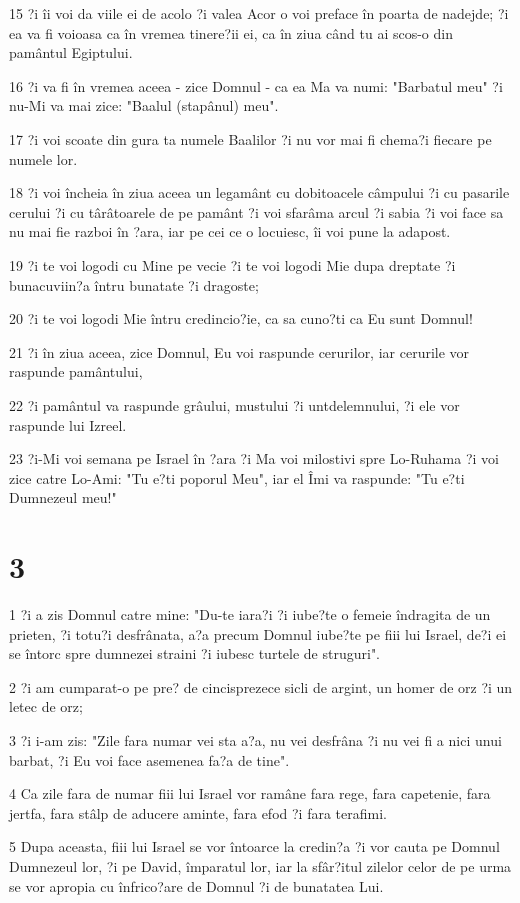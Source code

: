 \par 15 ?i îi voi da viile ei de acolo ?i valea Acor o voi preface în poarta de nadejde; ?i ea va fi voioasa ca în vremea tinere?ii ei, ca în ziua când tu ai scos-o din pamântul Egiptului.
\par 16 ?i va fi în vremea aceea - zice Domnul - ca ea Ma va numi: "Barbatul meu" ?i nu-Mi va mai zice: "Baalul (stapânul) meu".
\par 17 ?i voi scoate din gura ta numele Baalilor ?i nu vor mai fi chema?i fiecare pe numele lor.
\par 18 ?i voi încheia în ziua aceea un legamânt cu dobitoacele câmpului ?i cu pasarile cerului ?i cu târâtoarele de pe pamânt ?i voi sfarâma arcul ?i sabia ?i voi face sa nu mai fie razboi în ?ara, iar pe cei ce o locuiesc, îi voi pune la adapost.
\par 19 ?i te voi logodi cu Mine pe vecie ?i te voi logodi Mie dupa dreptate ?i bunacuviin?a întru bunatate ?i dragoste;
\par 20 ?i te voi logodi Mie întru credincio?ie, ca sa cuno?ti ca Eu sunt Domnul!
\par 21 ?i în ziua aceea, zice Domnul, Eu voi raspunde cerurilor, iar cerurile vor raspunde pamântului,
\par 22 ?i pamântul va raspunde grâului, mustului ?i untdelemnului, ?i ele vor raspunde lui Izreel.
\par 23 ?i-Mi voi semana pe Israel în ?ara ?i Ma voi milostivi spre Lo-Ruhama ?i voi zice catre Lo-Ami: "Tu e?ti poporul Meu", iar el Îmi va raspunde: "Tu e?ti Dumnezeul meu!"

\chapter{3}

\par 1 ?i a zis Domnul catre mine: "Du-te iara?i ?i iube?te o femeie îndragita de un prieten, ?i totu?i desfrânata, a?a precum Domnul iube?te pe fiii lui Israel, de?i ei se întorc spre dumnezei straini ?i iubesc turtele de struguri".
\par 2 ?i am cumparat-o pe pre? de cincisprezece sicli de argint, un homer de orz ?i un letec de orz;
\par 3 ?i i-am zis: "Zile fara numar vei sta a?a, nu vei desfrâna ?i nu vei fi a nici unui barbat, ?i Eu voi face asemenea fa?a de tine".
\par 4 Ca zile fara de numar fiii lui Israel vor ramâne fara rege, fara capetenie, fara jertfa, fara stâlp de aducere aminte, fara efod ?i fara terafimi.
\par 5 Dupa aceasta, fiii lui Israel se vor întoarce la credin?a ?i vor cauta pe Domnul Dumnezeul lor, ?i pe David, împaratul lor, iar la sfâr?itul zilelor celor de pe urma se vor apropia cu înfrico?are de Domnul ?i de bunatatea Lui.

